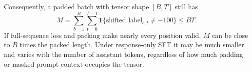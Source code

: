 Consequently, a padded batch with tensor shape $[B,T]$ still has
\begin{equation}
  M=\sum_{b=1}^{B}\sum_{t=0}^{T-1}
    \mathbf{1}\{\text{shifted label}_{b,t}\neq -100\}\leq BT.
\end{equation}
If full-sequence loss and packing make nearly every position valid, $M$ can be close to
$B$ times the packed length. Under response-only SFT it may be much smaller and varies
with the number of assistant tokens, regardless of how much padding or masked prompt
context occupies the tensor.
